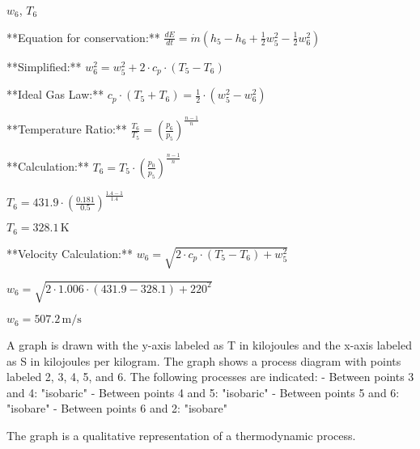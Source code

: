 \( w_6 \), \( T_6 \)  

**Equation for conservation:**  
\( \frac{dE}{dt} = \dot{m} (h_5 - h_6 + \frac{1}{2} w_5^2 - \frac{1}{2} w_6^2) \)  

**Simplified:**  
\( w_6^2 = w_5^2 + 2 \cdot c_p \cdot (T_5 - T_6) \)  

**Ideal Gas Law:**  
\( c_p \cdot (T_5 + T_6) = \frac{1}{2} \cdot (w_5^2 - w_6^2) \)  

**Temperature Ratio:**  
\( \frac{T_6}{T_5} = \left( \frac{p_6}{p_5} \right)^{\frac{n-1}{n}} \)  

**Calculation:**  
\( T_6 = T_5 \cdot \left( \frac{p_0}{p_5} \right)^{\frac{n-1}{n}} \)  

\( T_6 = 431.9 \cdot \left( \frac{0.181}{0.5} \right)^{\frac{1.4-1}{1.4}} \)  

\( T_6 = 328.1 \, \text{K} \)  

**Velocity Calculation:**  
\( w_6 = \sqrt{2 \cdot c_p \cdot (T_5 - T_6) + w_5^2} \)  

\( w_6 = \sqrt{2 \cdot 1.006 \cdot (431.9 - 328.1) + 220^2} \)  

\( w_6 = 507.2 \, \text{m/s} \)

A graph is drawn with the y-axis labeled as T in kilojoules and the x-axis labeled as S in kilojoules per kilogram. The graph shows a process diagram with points labeled 2, 3, 4, 5, and 6. The following processes are indicated:  
- Between points 3 and 4: "isobaric"  
- Between points 4 and 5: "isobaric"  
- Between points 5 and 6: "isobare"  
- Between points 6 and 2: "isobare"  

The graph is a qualitative representation of a thermodynamic process.